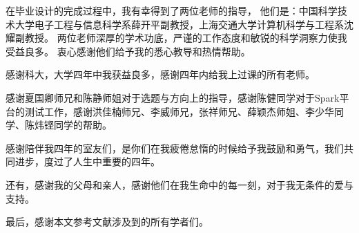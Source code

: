 \begin{acknowledgements}

在毕业设计的完成过程中，我有幸得到了两位老师的指导，
他们是：中国科学技术大学电子工程与信息科学系薛开平副教授，上海交通大学计算机科学与工程系沈耀副教授。
两位老师深厚的学术功底，严谨的工作态度和敏锐的科学洞察力使我受益良多。
衷心感谢他们给予我的悉心教导和热情帮助。

感谢科大，大学四年中我获益良多，感谢四年内给我上过课的所有老师。

感谢夏国卿师兄和陈静师姐对于选题与方向上的指导，感谢陈健同学对于Spark平台的测试工作，感谢洪佳楠师兄、李威师兄，张祥师兄、薛颖杰师姐、李少华同学、陈炜铿同学的帮助。

感谢陪伴我四年的室友们，是你们在我疲倦怠惰的时候给予我鼓励和勇气，我们共同进步，度过了人生中重要的四年。

还有，感谢我的父母和亲人，感谢他们在我生命中的每一刻，对于我无条件的爱与支持。

最后，感谢本文参考文献涉及到的所有学者们。

\end{acknowledgements}
